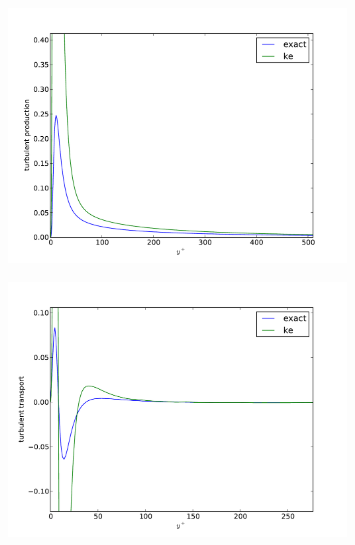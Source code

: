 \documentclass[12pt]{article}
\begin{document}
\begin{figure}[h!]
\centering
\includegraphics[width=0.8\textwidth]{figure_4.pdf}
\end{figure}

\begin{figure}[h!]
\centering
\includegraphics[width=0.8\textwidth]{figure_5.pdf}
\end{figure}

\clearpage

\end{document}
